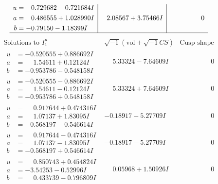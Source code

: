 \documentclass[1p]{elsarticle_modified}
\theoremstyle{definition}
\newcommand{\I}{\sqrt{-1}}
\begin{document}
$$\begin{array}{c|c|c}
\begin{aligned}
u &= -0.729682 - 0.721684 I \\
a &= \phantom{-}0.486555 + 1.028990 I \\
b &= -0.79150 - 1.18399 I\end{aligned}
 & \phantom{-}2.08567 + 3.75466 I & \phantom{-0.000000 } 0\\
 \hline 
 \end{array}$$\newpage$$\begin{array}{c|c|c}  
\text{Solutions to }I^u_{1}& \I (\text{vol} + \sqrt{-1}CS) & \text{Cusp shape}\\
 \hline 
\begin{aligned}
u &= -0.520555 + 0.886692 I \\
a &= \phantom{-}1.54611 + 0.12124 I \\
b &= -0.953786 - 0.548158 I\end{aligned}
 & \phantom{-}5.33324 - 7.64609 I & \phantom{-0.000000 } 0 \\ \hline\begin{aligned}
u &= -0.520555 - 0.886692 I \\
a &= \phantom{-}1.54611 - 0.12124 I \\
b &= -0.953786 + 0.548158 I\end{aligned}
 & \phantom{-}5.33324 + 7.64609 I & \phantom{-0.000000 } 0 \\ \hline\begin{aligned}
u &= \phantom{-}0.917644 + 0.474316 I \\
a &= \phantom{-}1.07137 + 1.83095 I \\
b &= -0.568197 - 0.546614 I\end{aligned}
 & -0.18917 - 5.27709 I & \phantom{-0.000000 } 0 \\ \hline\begin{aligned}
u &= \phantom{-}0.917644 - 0.474316 I \\
a &= \phantom{-}1.07137 - 1.83095 I \\
b &= -0.568197 + 0.546614 I\end{aligned}
 & -0.18917 + 5.27709 I & \phantom{-0.000000 } 0 \\ \hline\begin{aligned}
u &= \phantom{-}0.850743 + 0.454824 I \\
a &= -3.54253 - 0.52996 I \\
b &= \phantom{-}0.433739 - 0.796809 I\end{aligned}
 & \phantom{-}0.05968 + 1.50926 I & \phantom{-0.000000 } 0 \\ \hline\begin{aligned}

\end{aligned}
\end{array}$$
\end{document}
